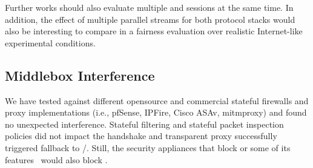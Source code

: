 Further works should also evaluate multiple \tcpls and
\quic sessions at the same time. In addition, the effect of multiple parallel
streams for both protocol stacks would also be interesting to compare in a
fairness evaluation over realistic Internet-like experimental conditions.




\subsection{Middlebox Interference}
\label{sec:middlebox}

We have tested \tcpls against different opensource and commercial stateful
firewalls and proxy implementations (i.e., pfSense, IPFire, Cisco ASAv,
mitmproxy) and found no unexpected interference. Stateful filtering and stateful
packet inspection policies did not impact the \tcpls handshake and transparent
\tls proxy successfully triggered \tcpls fallback to \tls/\tcp. Still, the security appliances that block  or some of its features~\cite{lee2019matls,Bock_China,raman2020measuring} would also block \tcpls.

